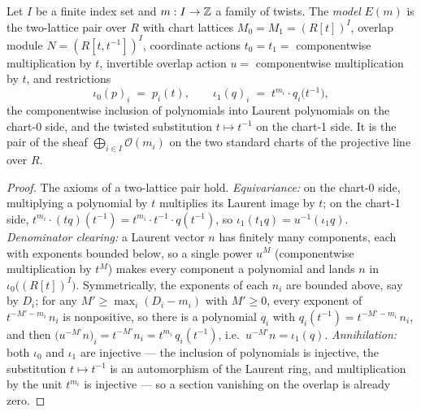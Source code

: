 \begin{definition}
  \label{pa-def:twoLattice_model}
  \leanok

  Let \(I\) be a finite index set and \(m : I \to \mathbb{Z}\) a family of twists. The
  \emph{model} \(E(m)\) is the two-lattice pair over \(R\) with chart lattices
  \(M_0 = M_1 = (R[t])^I\), overlap module \(N = (R[t, t^{-1}])^I\), coordinate actions
  \(t_0 = t_1 =\) componentwise multiplication by \(t\), invertible overlap action
  \(u =\) componentwise multiplication by \(t\), and restrictions
  \[
    \iota_0(p)_i \;=\; p_i(t), \qquad
    \iota_1(q)_i \;=\; t^{m_i} \cdot q_i\bigl(t^{-1}\bigr) ,
  \]
  the componentwise inclusion of polynomials into Laurent polynomials on the chart-0
  side, and the twisted substitution \(t \mapsto t^{-1}\) on the chart-1 side. It is
  the pair of the sheaf \(\bigoplus_{i \in I} \mathcal O(m_i)\) on the two standard
  charts of the projective line over \(R\).
\end{definition}
\begin{proof}
  \leanok
  The axioms of a two-lattice pair hold. \emph{Equivariance:} on the chart-0 side,
  multiplying a polynomial by \(t\) multiplies its Laurent image by \(t\); on the
  chart-1 side, \(t^{m_i} \cdot (t q)(t^{-1}) = t^{m_i} \cdot t^{-1} \cdot q(t^{-1})\),
  so \(\iota_1(t_1 q) = u^{-1}(\iota_1 q)\). \emph{Denominator clearing:} a Laurent
  vector \(n\) has finitely many components, each with exponents bounded below, so a
  single power \(u^M\) (componentwise multiplication by \(t^M\)) makes every component a
  polynomial and lands \(n\) in \(\iota_0\bigl((R[t])^I\bigr)\). Symmetrically, the
  exponents of each \(n_i\) are bounded above, say by \(D_i\); for any
  \(M' \ge \max_i (D_i - m_i)\) with \(M' \ge 0\), every exponent of
  \(t^{-M' - m_i}\, n_i\) is nonpositive, so there is a polynomial \(q_i\) with
  \(q_i(t^{-1}) = t^{-M' - m_i}\, n_i\), and then
  \(\bigl(u^{-M'} n\bigr)_i = t^{-M'} n_i = t^{m_i}\, q_i(t^{-1})\), i.e.\
  \(u^{-M'} n = \iota_1(q)\). \emph{Annihilation:} both
  \(\iota_0\) and \(\iota_1\) are injective --- the inclusion of polynomials is
  injective, the substitution \(t \mapsto t^{-1}\) is an automorphism of the Laurent
  ring, and multiplication by the unit \(t^{m_i}\) is injective --- so a section
  vanishing on the overlap is already zero.
\end{proof}

